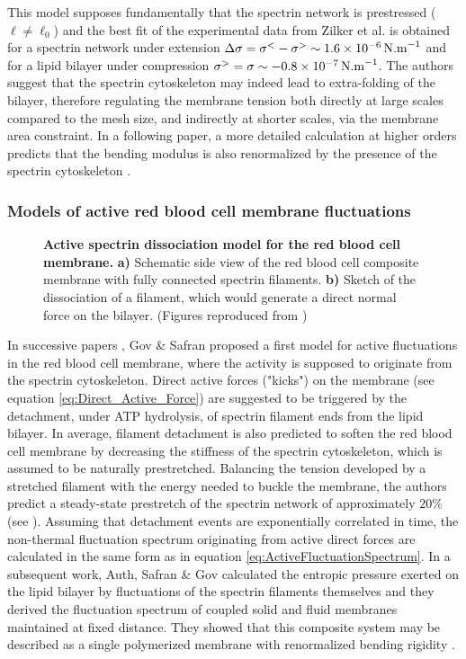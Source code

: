 \documentclass[graybox]{svmult}
\begin{document}
This model supposes fundamentally that the spectrin network is prestressed ($\ell \neq \ell_0$) and the best fit of the experimental data from Zilker et al. \cite{Zilker:1987} is obtained for a spectrin network under extension $\Delta \sigma = \sigma^{<} - \sigma^{>} \sim 1.6\times 10^{-6}\,\rm{N.m}^{-1}$ and for a lipid bilayer under compression $\sigma^{>} = \sigma \sim -0.8\times10^{-7}\,\rm{N.m}^{-1}$. The authors suggest that the spectrin cytoskeleton may indeed lead to extra-folding of the bilayer, therefore regulating the membrane tension both directly at large scales compared to the mesh size, and indirectly at shorter scales, via the membrane area constraint. In a following paper, a more detailed calculation at higher orders predicts that the bending modulus is also renormalized by the presence of the spectrin cytoskeleton \cite{Dubus:2006}.

		\subsubsection{Models of active red blood cell membrane fluctuations}

\begin{figure}[h!]
	\caption{\textbf{Active spectrin dissociation model for the red blood cell membrane.} \textbf{a)} Schematic side view of the red blood cell composite membrane with fully connected spectrin filaments. \textbf{b)} Sketch of the dissociation of a filament, which would generate a direct normal force on the bilayer. (Figures reproduced from \cite{Gov:2005}) }
	\label{fig:fig7}
\end{figure}	

In successive papers \cite{Gov:2004, Gov:2005, Gov:2007}, Gov \& Safran proposed a first model for active fluctuations in the red blood cell membrane, where the activity is supposed to originate from the spectrin cytoskeleton. Direct active forces ("kicks") on the membrane (see equation \eqref{eq:Direct_Active_Force}) are suggested to be triggered by the detachment, under ATP hydrolysis, of spectrin filament ends from the lipid bilayer. In average, filament detachment is also predicted to soften the red blood cell membrane by decreasing the stiffness of the spectrin cytoskeleton, which is assumed to be naturally prestretched. Balancing the tension developed by a stretched filament with the energy needed to buckle the membrane, the authors predict a steady-state prestretch of the spectrin network of approximately $20\%$ (see \cite{Gov:2005}). Assuming that detachment events are exponentially correlated in time, the non-thermal fluctuation spectrum originating from active direct forces are calculated in the same form as in equation \eqref{eq:ActiveFluctuationSpectrum}. In a subsequent work, Auth, Safran \& Gov calculated the entropic pressure exerted on the lipid bilayer by fluctuations of the spectrin filaments themselves \cite{Auth:2007_NJP} and they derived the fluctuation spectrum of coupled solid and fluid membranes maintained at fixed distance. They showed that this composite system may be described as a single polymerized membrane with renormalized bending rigidity \cite{Auth:2007_PRE}.
\end{document}
